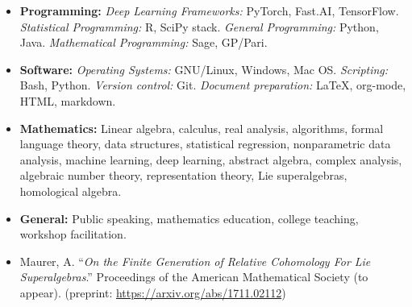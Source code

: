 \documentclass[10pt,a4paper]{article}
\begin{document}
{\begin{itemize}
  \item \textbf{Programming:} \textit{Deep Learning Frameworks:} PyTorch, Fast.AI, TensorFlow. \textit{Statistical Programming:} R, SciPy stack. \textit{General Programming:} Python, Java. \textit{Mathematical Programming:} Sage, GP/Pari. 
  \item \textbf{Software:} \textit{Operating Systems:} GNU/Linux, Windows, Mac OS. \textit{Scripting:} Bash, Python. \textit{Version control:} Git. \textit{Document preparation:} \LaTeX, org-mode, HTML, markdown.
   \item \textbf{Mathematics:} Linear algebra, calculus, real analysis, algorithms, formal language theory, data structures, statistical regression, nonparametric data analysis, machine learning, deep learning, abstract algebra, complex analysis, algebraic number theory, representation theory, Lie superalgebras, homological algebra.
   \item \textbf{General:} Public speaking, mathematics education, college teaching, workshop facilitation.
 \end{itemize}

\spacedhrule{0.5em}{-0.4em}
 
\begin{itemize}
\item Maurer, A. ``\emph{On the Finite Generation of Relative Cohomology For Lie Superalgebras}.'' Proceedings of the American Mathematical Society ({to appear}). \hfill (preprint: \url{https://arxiv.org/abs/1711.02112})
\end{itemize}


\spacedhrule{0.5em}{-0.4em}

}
\end{document}

